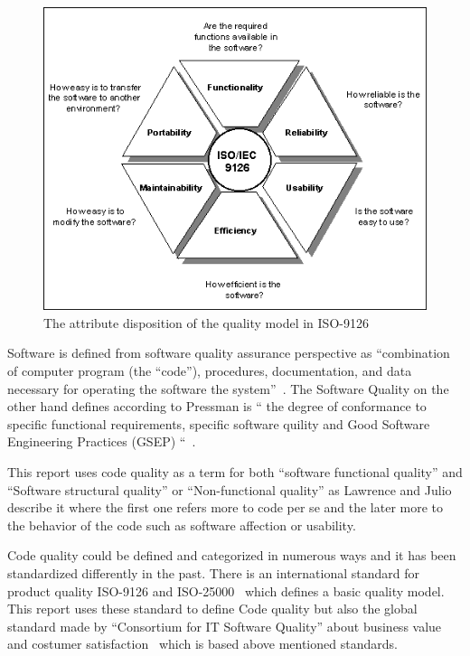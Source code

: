 
\begin{figure}
\begin{center}
\includegraphics[scale=0.8]{9126ref.png}
\caption{The attribute disposition of the quality model in ISO-9126}
\label{fig:isoPic}
\end{center}
\end{figure}

Software is defined from software quality assurance perspective as “combination of computer program (the “code”), procedures, documentation, and data necessary for operating the software the system”~\cite{Galin}. The Software Quality on the other hand defines according to Pressman is “ the degree of conformance to specific functional requirements, specific software quility and Good Software Engineering Practices (GSEP) “~\cite{Pressman}.

This report uses code quality as a term for both “software functional quality” and “Software structural quality” or “Non-functional quality” as Lawrence and Julio~\cite{Chung} describe it where the first one refers more to code per se and the later more to the behavior of the code such as software affection or usability. 

Code quality could be defined and categorized in numerous ways and it has been standardized differently in the past. There is an international standard for product quality ISO-9126 and ISO-25000~\cite{ISO9126}  which defines a basic quality model. This report uses these standard to define Code quality but also the global standard made by “Consortium for IT Software Quality” about business value and costumer satisfaction~\cite{cisq} which is based above mentioned standards. 

